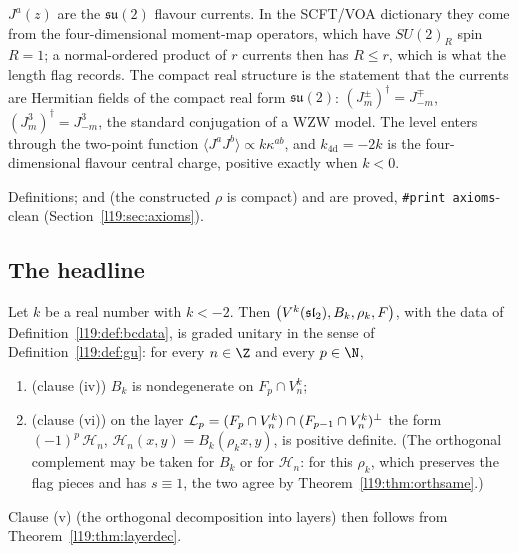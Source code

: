 \begin{physics}
$J^a(z)$ are the $\mathfrak{su}(2)$ flavour currents. In the SCFT/VOA dictionary they come from the
four-dimensional moment-map operators, which have $SU(2)_R$ spin $R = 1$; a normal-ordered product of $r$ currents
then has $R\le r$, which is what the length flag records. The compact real structure is the statement that
the currents are Hermitian fields of the compact real form $\mathfrak{su}(2)$: $(J^\pm_m)^\dagger = J^\mp_{-m}$,
$(J^3_m)^\dagger = J^3_{-m}$, the standard conjugation of a WZW model. The level enters through the two-point
function $\langle J^a J^b\rangle\propto k\kappa^{ab}$, and $k_{\mathrm{4d}} = -2k$ is the four-dimensional flavour
central charge, positive exactly when $k<0$.
\end{physics}

\begin{status}
Definitions;  and  (the constructed $\rho$
is compact) and  are proved, \texttt{\#print axioms}-clean
(Section~\ref{l19:sec:axioms}).
\end{status}

\subsection{The headline}

\begin{theorem}\label{l19:thm:bcheadline}
Let $k$ be a real number with $k<-2$. Then $\bigl(V^k(\mathfrak{sl}_2),B_k,\rho_k,F\bigr)$, with the data of
Definition~\ref{l19:def:bcdata}, is graded unitary in the sense of Definition~\ref{l19:def:gu}: for every
$n\in\Z$ and every $p\in\N$,
\begin{enumerate}
\item (clause (iv)) $B_k$ is nondegenerate on $F_p\cap V^k_n$;
\item (clause (vi)) on the layer $\mathcal{L}_p = (F_p\cap V^k_n)\cap(F_{p-1}\cap V^k_n)^{\perp}$ the form
  $(-1)^p\,\mathcal H_n$, $\mathcal H_n(x,y) = B_k(\rho_kx,y)$, is positive definite. (The orthogonal complement may be
  taken for $B_k$ or for $\mathcal H_n$: for this $\rho_k$, which preserves the flag pieces and has $s\equiv1$, the two
  agree by Theorem~\ref{l19:thm:orthsame}.)
\end{enumerate}
Clause (v) (the orthogonal decomposition into layers) then follows from Theorem~\ref{l19:thm:layerdec}.
\end{theorem}

